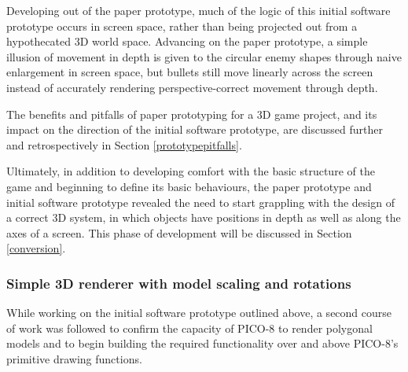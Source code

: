 \documentclass[11pt]{article}
\begin{document}
Developing out of the paper prototype, much of the logic of this initial software prototype occurs
in screen space, rather than being projected out from a hypothecated 3D world space. Advancing on
the paper prototype, a simple illusion of movement in depth is given to the circular enemy shapes
through naive enlargement in screen space, but bullets still move linearly across the screen instead
of accurately rendering perspective-correct movement through depth.


The benefits and pitfalls of paper prototyping for a 3D game project, and its impact on the
direction of the initial software prototype, are discussed further and retrospectively in
Section \ref{prototypepitfalls}.

Ultimately, in addition to developing comfort with the basic structure of the game and beginning
to define its basic behaviours, the paper prototype and initial software prototype revealed the
need to start grappling with the design of a correct 3D system, in which objects have positions
in depth as well as along the axes of a screen. This phase of development will be discussed in
Section \ref{conversion}.

\subsubsection*{Simple 3D renderer with model scaling and rotations}\label{renderer}


While working on the initial software prototype outlined above, a second course of work
was followed to confirm the capacity of PICO-8 to render polygonal models and to begin
building the required functionality over and above PICO-8's primitive drawing functions.
\end{document}
